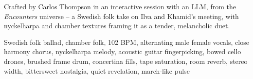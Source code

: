 

\begin{notes}
Crafted by Carlos Thompson in an interactive session with an LLM, from the \emph{Encounters} universe -- a Swedish folk take on Ilva and Khamid's meeting, with nyckelharpa and chamber textures framing it as a tender, melancholic duet.
\end{notes}

\begin{style}
Swedish folk ballad, chamber folk, 102 BPM, alternating male female vocals, close harmony chorus, nyckelharpa melody, acoustic guitar fingerpicking, bowed cello drones, brushed frame drum, concertina fills, tape saturation, room reverb, stereo width, bittersweet nostalgia, quiet revelation, march-like pulse
\end{style}

